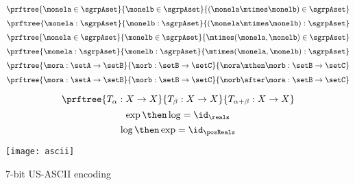 \begin{forslides}
\begin{equation}\label{eq:moncomp1}
\prftree{\monela \in \sgrpAset}{\monelb \in \sgrpAset}{(\monela \mtimes \monelb) \in \sgrpAset}
\end{equation}
\begin{equation}\label{eq:moncomp2}
\prftree{\monela : \sgrpAset}{\monelb : \sgrpAset}{(\monela \mtimes \monelb) : \sgrpAset}
\end{equation}
\begin{equation}\label{eq:moncomp3}
\prftree{\monela \in \sgrpAset}{\monelb \in \sgrpAset}{\mtimes (\monela,\monelb) \in \sgrpAset}
\end{equation}
\begin{equation}\label{eq:moncomp4}
\prftree{\monela : \sgrpAset}{\monelb : \sgrpAset}{\mtimes (\monela ,\monelb) : \sgrpAset}
\end{equation}
\begin{equation}\label{eq:funccomp1}
\prftree{\mora : \setA \to \setB}{\morb : \setB \to \setC}{\mora \mthen \morb : \setB \to \setC}
\end{equation}
\begin{equation}\label{eq:funccomp2}
\prftree{\mora : \setA \to \setB}{\morb : \setB \to \setC}{\morb \after \mora : \setB \to \setC}
\end{equation}

\begin{equation}\label{eq:funccomp3}
\prftree{T_\alpha:  X \to X }{T_\beta : X \to X}{T_{\alpha+\beta} : X \to X}
\end{equation}
\begin{equation}\label{eq:explogid}
\exp \then \log = \id_{\reals}
\end{equation}
\begin{equation}\label{eq:logexpid}
\log \then \exp = \id_{\posReals}
\end{equation}
\end{forslides}


\begin{marginfigure}
\texttt{[image: ascii]}
\caption{7-bit US-ASCII encoding }
\label{fig:ascii}
\end{marginfigure}

